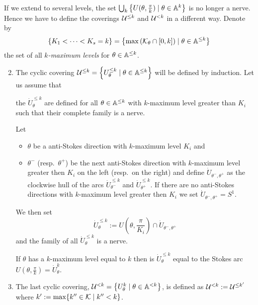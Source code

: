 If we extend to several levels, the set
$\bigcup_k\left\{U(\theta,\frac{\pi}{k})\mid\theta\in\mathbb{A}^{k}\right\}$ is no
longer a nerve.
Hence we have to define the coverings $\mathcal{U}^{\leq k}$ and $\mathcal{U}^{<k}$ in a
different way.
Denote by
\[
  \left\{K_1<\cdots<K_s=k\right\}
  =\left\{\max\left(\mathcal{K}_\theta\cap[0,k]\right)\mid\theta\in\mathbb{A}^{\leq k}\right\}
\]
the set of all \emph{$k$-maximum levels} for $\theta\in\mathbb{A}^{\leq k}$.
\begin{enumerate}
  \setcounter{enumi}{1}
  \item The cyclic covering
    $\mathcal{U}^{\leq k}=\left\{U_\theta^{\leq k}\mid\theta\in\mathbb{A}^{\leq k}\right\}$
    will be defined by induction.
    Let us assume that
    \begin{einr}
      the $\dot U_\theta^{\leq k}$ are defined for all $\theta\in\mathbb{A}^{\leq k}$
      with $k$-maximum level greater than $K_i$ such that their complete family
      is a nerve.
    \end{einr}
    Let
    \begin{itemize}
      \item $\theta$ be a anti-Stokes direction with $k$-maximum level $K_i$
        and
      \item $\theta^-$ (resp.\ $\theta^+$) be the next anti-Stokes direction
        with $k$-maximum level greater then $K_i$ on the left (resp.\ on the
        right) and define $\dot U_{\theta^-,\theta^+}$ as the clockwise hull of
        the arcs $\dot U_{\theta^-}^{\leq k}$ and $\dot U_{\theta^+}^{\leq k}$.
        If there are no anti-Stokes directions with $k$-maximum level greater
        then $K_i$ we set $\dot U_{\theta^-,\theta^+}=S^1$.
    \end{itemize}
    We then set
    \[
      \dot U_\theta^{\leq k}
        :=U\left(\theta,\frac{\pi}{K_i}\right)\cap\dot U_{\theta^-,\theta^+}
    \]
    and the family of all $\dot U_\theta^{\leq k}$ is a nerve.\PROBLEM[proof!]
    \begin{rem}
      If $\theta$ has a $k$-maximum level equal to $k$ then is
      $\dot U_\theta^{\leq k}$ equal to the Stokes arc
      $U\left(\theta,\frac{\pi}{k}\right)=\dot U_\theta^k$.
    \end{rem}
\end{enumerate}

\begin{enumerate}
  \setcounter{enumi}{2}
\item The last cyclic covering,
  $\mathcal{U}^{<k}=\left\{U_{\theta}^k\mid\theta\in\mathbb{A}^{<k}\right\}$, is defined as
  $\mathcal{U}^{<k}:=\mathcal{U}^{\leq k'}$ where $k':=\max\{k''\in\mathcal{K}\mid k''<k\}$.
\end{enumerate}

